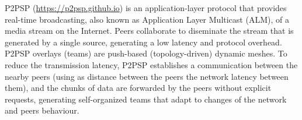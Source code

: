 P2PSP (\url{https://p2psp.github.io}) is an application-layer protocol
that provides real-time broadcasting, also known as Application Layer
Multicast (ALM), of a media stream on the Internet. Peers collaborate
to diseminate the stream that is generated by a single source,
generating a low latency and protocol overhead. P2PSP overlays (teams)
are push-based (topology-driven) dynamic meshes. To reduce the
transmission latency, P2PSP establishes a communication between the
nearby peers (using as distance between the peers the network latency
between them), and the chunks of data are forwarded by the peers
without explicit requests, generating self-organized teams that adapt
to changes of the network and peers behaviour.
